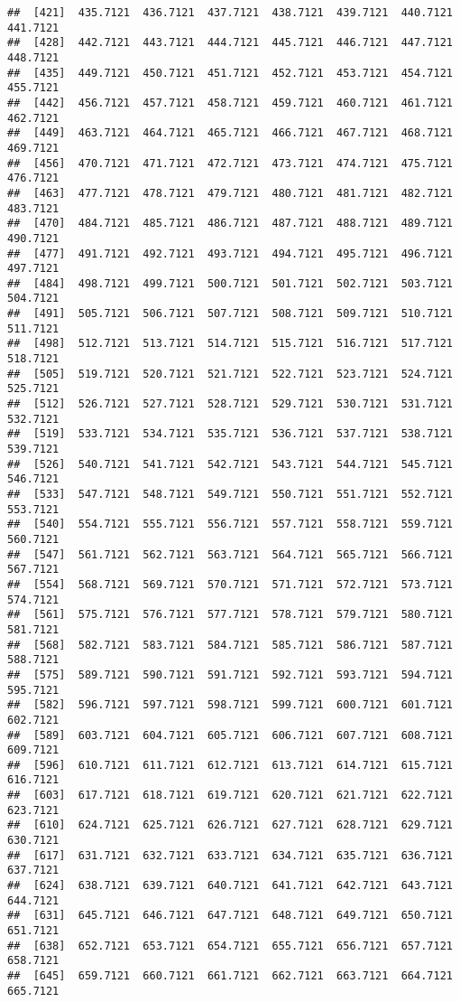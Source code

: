 \documentclass[
]{article}
\begin{document}
\begin{verbatim}
##  [421]  435.7121  436.7121  437.7121  438.7121  439.7121  440.7121  441.7121
##  [428]  442.7121  443.7121  444.7121  445.7121  446.7121  447.7121  448.7121
##  [435]  449.7121  450.7121  451.7121  452.7121  453.7121  454.7121  455.7121
##  [442]  456.7121  457.7121  458.7121  459.7121  460.7121  461.7121  462.7121
##  [449]  463.7121  464.7121  465.7121  466.7121  467.7121  468.7121  469.7121
##  [456]  470.7121  471.7121  472.7121  473.7121  474.7121  475.7121  476.7121
##  [463]  477.7121  478.7121  479.7121  480.7121  481.7121  482.7121  483.7121
##  [470]  484.7121  485.7121  486.7121  487.7121  488.7121  489.7121  490.7121
##  [477]  491.7121  492.7121  493.7121  494.7121  495.7121  496.7121  497.7121
##  [484]  498.7121  499.7121  500.7121  501.7121  502.7121  503.7121  504.7121
##  [491]  505.7121  506.7121  507.7121  508.7121  509.7121  510.7121  511.7121
##  [498]  512.7121  513.7121  514.7121  515.7121  516.7121  517.7121  518.7121
##  [505]  519.7121  520.7121  521.7121  522.7121  523.7121  524.7121  525.7121
##  [512]  526.7121  527.7121  528.7121  529.7121  530.7121  531.7121  532.7121
##  [519]  533.7121  534.7121  535.7121  536.7121  537.7121  538.7121  539.7121
##  [526]  540.7121  541.7121  542.7121  543.7121  544.7121  545.7121  546.7121
##  [533]  547.7121  548.7121  549.7121  550.7121  551.7121  552.7121  553.7121
##  [540]  554.7121  555.7121  556.7121  557.7121  558.7121  559.7121  560.7121
##  [547]  561.7121  562.7121  563.7121  564.7121  565.7121  566.7121  567.7121
##  [554]  568.7121  569.7121  570.7121  571.7121  572.7121  573.7121  574.7121
##  [561]  575.7121  576.7121  577.7121  578.7121  579.7121  580.7121  581.7121
##  [568]  582.7121  583.7121  584.7121  585.7121  586.7121  587.7121  588.7121
##  [575]  589.7121  590.7121  591.7121  592.7121  593.7121  594.7121  595.7121
##  [582]  596.7121  597.7121  598.7121  599.7121  600.7121  601.7121  602.7121
##  [589]  603.7121  604.7121  605.7121  606.7121  607.7121  608.7121  609.7121
##  [596]  610.7121  611.7121  612.7121  613.7121  614.7121  615.7121  616.7121
##  [603]  617.7121  618.7121  619.7121  620.7121  621.7121  622.7121  623.7121
##  [610]  624.7121  625.7121  626.7121  627.7121  628.7121  629.7121  630.7121
##  [617]  631.7121  632.7121  633.7121  634.7121  635.7121  636.7121  637.7121
##  [624]  638.7121  639.7121  640.7121  641.7121  642.7121  643.7121  644.7121
##  [631]  645.7121  646.7121  647.7121  648.7121  649.7121  650.7121  651.7121
##  [638]  652.7121  653.7121  654.7121  655.7121  656.7121  657.7121  658.7121
##  [645]  659.7121  660.7121  661.7121  662.7121  663.7121  664.7121  665.7121

\end{verbatim}
\end{document}
